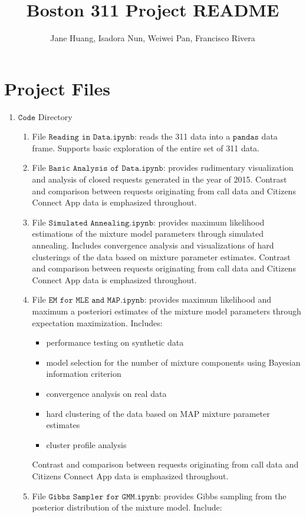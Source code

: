 \documentclass{article}
\title{\textbf{\Large{Boston 311 Project README} }  }
\author{Jane Huang, Isadora Nun, Weiwei Pan, Francisco Rivera}
\date{}
\theoremstyle{theorem}
\theoremstyle{theorem}
\theoremstyle{theorem}
\theoremstyle{lemma}
\theoremstyle{definition}
\theoremstyle{example}
\begin{document}
\maketitle


\section{Project Files}
\begin{enumerate}
\item $\texttt{Code}$ Directory
\begin{enumerate}
\item File $\texttt{Reading in Data.ipynb}$: reads the 311 data into a $\texttt{pandas}$ data frame. Supports basic exploration of the entire set of 311 data.
\item File $\texttt{Basic Analysis of Data.ipynb}$: provides rudimentary visualization and analysis of closed requests generated in the year of 2015. Contrast and comparison between requests originating from call data and Citizens Connect App data is emphasized throughout.
\item File $\texttt{Simulated Annealing.ipynb}$: provides maximum likelihood estimations of the mixture model parameters through simulated annealing. Includes convergence analysis and visualizations of hard clusterings of the data based on mixture parameter estimates. Contrast and comparison between requests originating from call data and Citizens Connect App data is emphasized throughout.
\item File $\texttt{EM for MLE and MAP.ipynb}$: provides maximum likelihood and maximum a posteriori estimates of the mixture model parameters through expectation maximization. Includes:
\begin{itemize}
\item performance testing on synthetic data
\item model selection for the number of mixture components using Bayesian information criterion
\item convergence analysis on real data
\item hard clustering of the data based on MAP mixture parameter estimates
\item cluster profile analysis
\end{itemize}
Contrast and comparison between requests originating from call data and Citizens Connect App data is emphasized throughout.
\item File $\texttt{Gibbs Sampler for GMM.ipynb}$: provides Gibbs sampling from the posterior distribution of the mixture model. Include:

\end{enumerate}
\end{enumerate}
\end{document}
